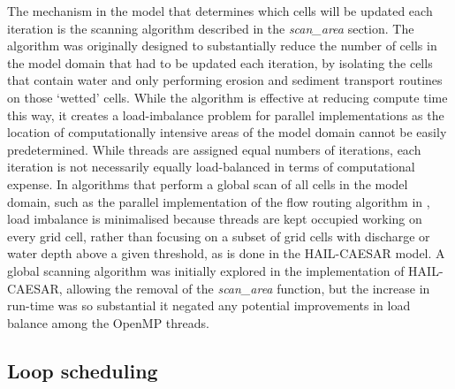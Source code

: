 The mechanism in the model that determines which cells will be updated each iteration is the scanning algorithm described in the \textit{scan\_area} section. The algorithm was originally designed \citep{Coulthard2013} to substantially reduce the number of cells in the model domain that had to be updated each iteration, by isolating the cells that contain water and only performing erosion and sediment transport routines on those `wetted' cells. While the algorithm is effective at reducing compute time this way, it creates a load-imbalance problem for parallel implementations as the location of computationally intensive areas of the model domain cannot be easily predetermined. While threads are assigned equal numbers of iterations, each iteration is not necessarily equally load-balanced in terms of computational expense. In algorithms that perform a global scan of all cells in the model domain, such as the parallel implementation of the flow routing algorithm in \citet{neal2009parallelisation}, load imbalance is minimalised because threads are kept occupied working on every grid cell, rather than focusing on a subset of grid cells with discharge or water depth above a given threshold, as is done in the HAIL-CAESAR model. A global scanning algorithm was initially explored in the implementation of HAIL-CAESAR, allowing the removal of the \textit{scan\_area} function, but the increase in run-time was so substantial it negated any potential improvements in load balance among the OpenMP threads. 

\subsection{Loop scheduling}

